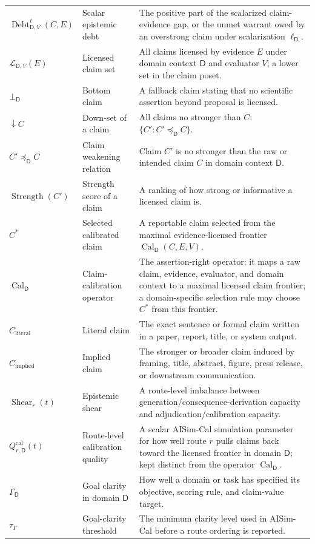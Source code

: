 \documentclass[11pt,a4paper]{article}
\newcommand{\Strength}{\operatorname{Strength}}
\newcommand{\Cal}{\operatorname{Cal}}
\newcommand{\Debt}{\operatorname{Debt}}
\newcommand{\Shear}{\operatorname{Shear}}
\newcommand{\Dom}{\mathsf{D}}
\begin{document}
{\begin{longtable}{@{}p{2.8cm}p{4.1cm}p{6.4cm}@{}}
$\Debt^\ell_{\Dom,V}(C,E)$ & Scalar epistemic debt & The positive part of the scalarized claim-evidence gap, or the unmet warrant owed by an overstrong claim under scalarization $\ell_{\Dom}$. \\
$\mathcal{L}_{\Dom,V}(E)$ & Licensed claim set & All claims licensed by evidence $E$ under domain context $\Dom$ and evaluator $V$; a lower set in the claim poset. \\
$\bot_{\Dom}$ & Bottom claim & A fallback claim stating that no scientific assertion beyond proposal is licensed. \\
$\downarrow C$ & Down-set of a claim & All claims no stronger than $C$: $\{C':C'\preceq_{\Dom} C\}$. \\
$C'\preceq_{\Dom} C$ & Claim weakening relation & Claim $C'$ is no stronger than the raw or intended claim $C$ in domain context $\Dom$. \\
$\Strength(C')$ & Strength score of a claim & A ranking of how strong or informative a licensed claim is. \\
$C^\ast$ & Selected calibrated claim & A reportable claim selected from the maximal evidence-licensed frontier $\Cal_{\Dom}(C,E,V)$. \\
$\Cal_{\Dom}$ & Claim-calibration operator & The assertion-right operator: it maps a raw claim, evidence, evaluator, and domain context to a maximal licensed claim frontier; a domain-specific selection rule may choose $C^\ast$ from this frontier. \\
$C_{\mathrm{literal}}$ & Literal claim & The exact sentence or formal claim written in a paper, report, title, or system output. \\
$C_{\mathrm{implied}}$ & Implied claim & The stronger or broader claim induced by framing, title, abstract, figure, press release, or downstream communication. \\
$\Shear_r(t)$ & Epistemic shear & A route-level imbalance between generation/consequence-derivation capacity and adjudication/calibration capacity. \\
$Q^{\mathrm{cal}}_{r,\Dom}(t)$ & Route-level calibration quality & A scalar AISim-Cal simulation parameter for how well route $r$ pulls claims back toward the licensed frontier in domain $\Dom$; kept distinct from the operator $\Cal_{\Dom}$. \\
$\Gamma_{\Dom}$ & Goal clarity in domain $\Dom$ & How well a domain or task has specified its objective, scoring rule, and claim-value target. \\
$\tau_\Gamma$ & Goal-clarity threshold & The minimum clarity level used in AISim-Cal before a route ordering is reported. \\

\end{longtable}}
\end{document}
